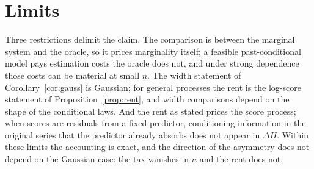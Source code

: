 \documentclass[11pt]{article}
\theoremstyle{remark}
\begin{document}
\section{Limits}\label{sec:limits}

Three restrictions delimit the claim. The comparison is between the marginal system and the
oracle, so it prices marginality itself; a feasible past-conditional model pays estimation costs
the oracle does not, and under strong dependence those costs can be material at small $n$. The
width statement of Corollary~\ref{cor:gauss} is Gaussian; for general processes the rent is the
log-score statement of Proposition~\ref{prop:rent}, and width comparisons depend on the shape of
the conditional laws. And the rent as stated prices the score process; when scores are residuals
from a fixed predictor, conditioning information in the original series that the predictor
already absorbs does not appear in $\Delta H$. Within these limits the accounting is exact, and
the direction of the asymmetry does not depend on the Gaussian case: the tax vanishes in $n$ and
the rent does not.



\end{document}
